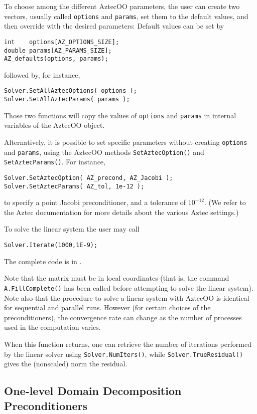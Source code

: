 To choose among the different AztecOO parameters, the user can create
two vectors, usually called \verb!options! and \verb!params!, set them
to the default values, and then override with the desired parameters:
Default values can be set by
\begin{verbatim}
int    options[AZ_OPTIONS_SIZE];
double params[AZ_PARAMS_SIZE];
AZ_defaults(options, params);
\end{verbatim}
followed by, for instance,
\begin{verbatim}
Solver.SetAllAztecOptions( options );
Solver.SetAllAztecParams( params );
\end{verbatim}
Those two functions will copy the values of \verb!options! and
\verb!params! in internal variables of the AztecOO object.

Alternatively, it is possible to set specific parameters without
creating \verb!options! and \verb!params!, using the AztecOO methods
\verb!SetAztecOption()! and \verb!SetAztecParams()!. 
For instance,
\begin{verbatim}
Solver.SetAztecOption( AZ_precond, AZ_Jacobi );
Solver.SetAztecParams( AZ_tol, 1e-12 );
\end{verbatim}
to specify a point Jacobi preconditioner, and a tolerance of $10^{-12}$.
(We refer to the Aztec documentation for more details about the various
Aztec settings.)

To solve the linear system the user may call
\begin{verbatim}
Solver.Iterate(1000,1E-9);
\end{verbatim}
The complete code is in .

Note that the matrix must be in local coordinates (that is, the command
\verb!A.FillComplete()! has been called before attempting to solve
the linear system).  Note also that the procedure to solve a linear
system with AztecOO is identical for sequential and parallel runs.
However (for certain choices of the preconditioners), the convergence
rate can change as the number of processes used in the computation
varies.

When this function returns, one can retrieve the number of iterations
performed by the linear solver using \verb!Solver.NumIters()!, while
\verb!Solver.TrueResidual()! gives the (nonscaled) norm the residual.



\subsection{One-level Domain Decomposition Preconditioners}
\label{sec:aztecoo_dd}


